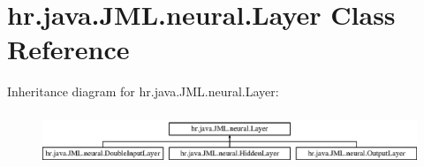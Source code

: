 \hypertarget{classhr_1_1java_1_1_j_m_l_1_1neural_1_1_layer}{\section{hr.\+java.\+J\+M\+L.\+neural.\+Layer Class Reference}
\label{classhr_1_1java_1_1_j_m_l_1_1neural_1_1_layer}
}
Inheritance diagram for hr.\+java.\+J\+M\+L.\+neural.\+Layer\+:\begin{figure}[H]
\begin{center}
\leavevmode
\includegraphics[height=1.602289cm]{classhr_1_1java_1_1_j_m_l_1_1neural_1_1_layer}
\end{center}
\end{figure}

